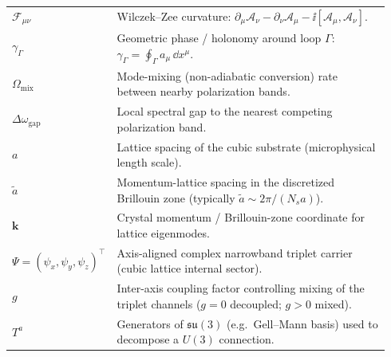 \begin{center}
\begin{tabular}{p{0.22\linewidth} p{0.72\linewidth}}
$\mathcal{F}_{\mu\nu}$ & Wilczek--Zee curvature: $\partial_\mu\mathcal{A}_\nu-\partial_\nu\mathcal{A}_\mu-\ii[\mathcal{A}_\mu,\mathcal{A}_\nu]$.\\
$\gamma_\Gamma$ & Geometric phase / holonomy around loop $\Gamma$: $\gamma_\Gamma=\oint_\Gamma a_\mu\,\dd x^\mu$.\\
$\Omega_{\mathrm{mix}}$ & Mode-mixing (non-adiabatic conversion) rate between nearby polarization bands.\\
$\Delta\omega_{\mathrm{gap}}$ & Local spectral gap to the nearest competing polarization band.\\
$a$ & Lattice spacing of the cubic substrate (microphysical length scale).\\
$\tilde a$ & Momentum-lattice spacing in the discretized Brillouin zone (typically $\tilde a\sim 2\pi/(N_sa)$).\\
$\mathbf{k}$ & Crystal momentum / Brillouin-zone coordinate for lattice eigenmodes.\\
$\Psi=(\psi_x,\psi_y,\psi_z)^\top$ & Axis-aligned complex narrowband triplet carrier (cubic lattice internal sector).\\
$g$ & Inter-axis coupling factor controlling mixing of the triplet channels ($g=0$ decoupled; $g>0$ mixed).\\
$T^a$ & Generators of $\mathfrak{su}(3)$ (e.g.\ Gell--Mann basis) used to decompose a $U(3)$ connection.\\
\end{tabular}
\end{center}
